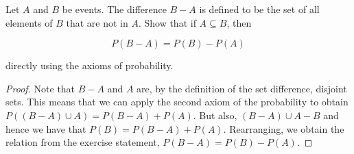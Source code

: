 \begin{exercise}{44}
Let $A$ and $B$ be events. The difference $B - A$ is defined to be the set of all elements of $B$ that are not in $A$. Show that if $A \subseteq B$, then

$$P(B-A) = P(B) - P(A)$$

directly using the axioms of probability.
\end{exercise}

\begin{proof}
    Note that $B-A$ and $A$ are, by the definition of the set difference, disjoint sets. This means that we can apply the second axiom of the probability to obtain $P((B-A) \cup A) = P(B-A) + P(A)$. But also, $(B-A) \cup A - B$ and hence we have that $P(B) = P(B-A) + P(A)$. Rearranging, we obtain the relation from the exercise statement, $P(B-A) = P(B) - P(A)$.
\end{proof}

